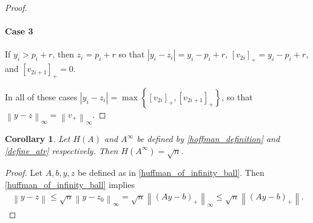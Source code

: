\documentclass{article}
\newtheorem{corollary}[theorem]{Corollary}
\theoremstyle{case}
\numberwithin{theorem}{subsection}
\newcommand{\atr}{A^{\infty}}
\begin{document}
\begin{proof}
\paragraph{Case 3}
If $y_i > p_i + r              $, then $z_i = p_i + r$ so that $\left|y_i - z_i\right| = y_i - p_i + r$, $\left[v_{2i}\right]_+ = y_i - p_i + r$, and $\left[v_{2i+1}\right]_+ = 0$.

In all of these cases $\left|y_i - z_i\right| = \max\left\{\left[v_{2i}\right]_+, \left[v_{2i+1}\right]_+\right\}$,
so that $\left\|y - z\right\|_{\infty} = \left\| v_+ \right\|_{\infty}$.


\end{proof}

\begin{corollary}
Let $H(A)$ and $\atr$ be defined by \cref{hoffman_definition} and \cref{define_atr} respectively.
Then $H(\atr) = \sqrt{n}$.
\end{corollary}
\begin{proof}
Let $A, b, y, z$ be defined as in \cref{huffman_of_infinity_ball}.
Then \cref{huffman_of_infinity_ball} implies
\begin{align*}
\left\|y - z\right\|
\le \sqrt{n} \left\|y - z_0\right\|_{\infty}
= \sqrt{n} \left\|\left(Ay - b\right)_+\right\|_{\infty}
\le \sqrt{n} \left\|\left(Ay - b\right)_+\right\|.
\end{align*}
\end{proof}
\end{document}
